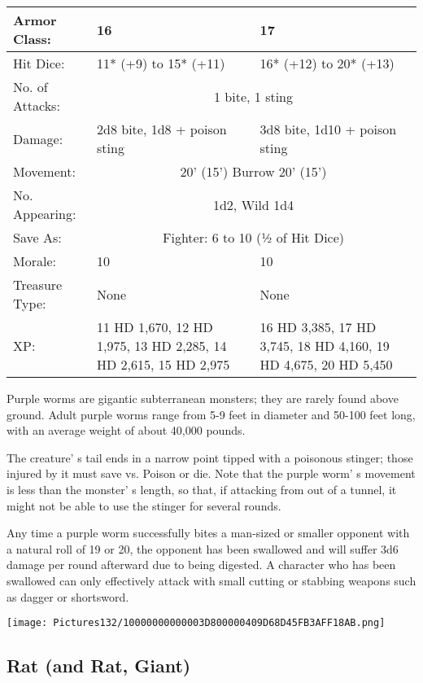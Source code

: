 \documentclass[a4paper,twoside,openany,10pt]{book}
\begin{document}
\begin{multicols}{2}
\begin{tabularx}{0.50\textwidth}{@{}lXX@{}}
Armor Class: & 16 & 17 \\\hline
Hit Dice: & 11* (+9) to 15* (+11) & 16* (+12) to 20* (+13) \\\hline
No. of Attacks: & \multicolumn{2}{c}{1 bite, 1 sting} \\\hline
Damage: & 2d8 bite, 1d8 + poison sting & 3d8 bite, 1d10 + poison sting \\\hline
Movement: & \multicolumn{2}{c}{20' (15') Burrow 20' (15')}\\\hline
No. Appearing: &  \multicolumn{2}{c}{1d2, Wild 1d4}\\\hline
Save As: & \multicolumn{2}{c}{Fighter: 6 to 10 (½ of Hit Dice)} \\\hline
Morale: & 10 & 10 \\\hline
Treasure Type: & None & None \\\hline
XP: & 11 HD 1,670, 12 HD 1,975, 13 HD 2,285, 14 HD 2,615, 15 HD 2,975 & 16 HD 3,385, 17 HD 3,745, 18 HD 4,160, 19 HD 4,675, 20 HD 5,450  \\\hline
\end{tabularx}\medskip

Purple worms are gigantic subterranean monsters; they are rarely found above ground. Adult purple worms range from 5-9 feet in diameter and 50-100 feet long, with an average weight of about 40,000 pounds. 

The creature' s tail ends in a narrow point tipped with a poisonous stinger; those injured by it must save vs. Poison or die. Note that the purple worm' s movement is less than the monster' s length, so that, if attacking from out of a tunnel, it might not be able to use the stinger for several rounds.

Any time a purple worm successfully bites a man-sized or smaller opponent with a natural roll of 19 or 20, the opponent has been swallowed and will suffer 3d6 damage per round afterward due to being digested. A character who has been swallowed can only effectively attack with small cutting or stabbing weapons such as dagger or shortsword.

\begin{center} \texttt{[image: Pictures132/10000000000003D800000409D68D45FB3AFF18AB.png]} \end{center}


\subsection*{Rat (and Rat, Giant)}\label{rat-and-rat-giant}


\end{multicols}
\end{document}
